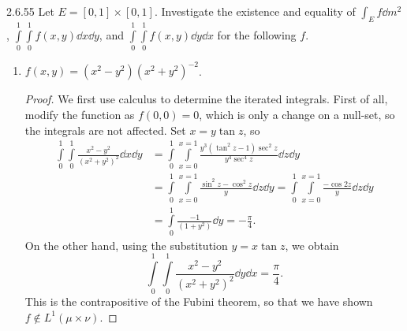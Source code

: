 \documentclass[11pt]{article}
\begin{document}
\begin{problem}{2.6.55}
  Let \( E = [0,1] \times [0,1] \).
  Investigate the existence and equality of \( \int_E f \dd{m}^2 \), \( \int\limits_0^1 \int\limits_0^1 f(x,y)\dd{x} \dd{y} \), and \( \int\limits_0^1 \int\limits_0^1 f(x,y)\dd{y} \dd{x} \) for the following \( f \).
  \begin{enumerate}[label=\alph*.]
    \item \( f(x,y) = (x^2 - y^2)(x^2 + y^2)^{-2} \).
          \begin{proof}
            We first use calculus to determine the iterated integrals.
            First of all, modify the function as \( f(0,0) = 0 \), which is only a change on a null-set, so the integrals are not affected.
            Set \( x = y\tan z \), so
            \begin{equation}
            \label{eq:1}
            \begin{aligned}
              \int\limits_0^1 \int\limits_{0}^{1} \frac{x^2 - y^2}{(x^2 + y^2)^2} \dd x \dd y &= \int\limits_0^1 \int\limits_{x=0}^{x=1} \frac{y^3(\tan^2 z - 1)\sec^2z }{y^{4}\sec^4z}\dd{z}\dd{y} \\
                                                                                            &= \int\limits_0^1 \int\limits_{x=0}^{x=1} \frac{\sin^2z - \cos^2z}{y} \dd{z} \dd{y} = \int\limits_0^1 \int\limits_{x = 0}^{x = 1} \frac{-\cos 2z}{y} \dd{z} \dd{y} \\
              &= \int\limits_0^1 \frac{-1}{(1 + y^2)} \dd{y} = - \frac{\pi}{4}.
            \end{aligned}
          \end{equation}
          On the other hand, using the substitution \( y = x\tan z \), we obtain
          \begin{equation}
          \label{eq:2}
          \int\limits_0^1 \int\limits_0^1 \frac{x^2 - y^2}{(x^2 + y^2)^2}\dd{y}\dd{x} = \frac{\pi}{4}.
        \end{equation}
        This is the contrapositive of the Fubini theorem, so that we have shown \( f \not\in L^1(\mu \times \nu) \).


\end{proof}
\end{enumerate}
\end{problem}
\end{document}
